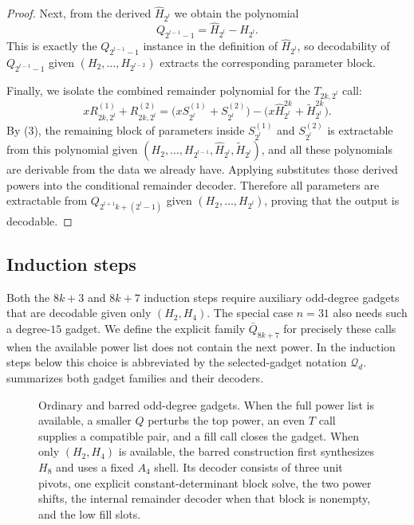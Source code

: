 \begin{proof}
    Next, from the derived $\hat H_{2^l}$ we obtain the polynomial
    \[
      Q_{2^{l-1}-1}=\hat H_{2^l}-H_{2^l}.
    \]
    This is exactly the $Q_{2^{l-1}-1}$ instance in the definition of $\hat H_{2^l}$, so decodability of $Q_{2^{l-1}-1}$ given $(H_2,\ldots,H_{2^{l-2}})$ extracts the corresponding parameter block.

    Finally, we isolate the combined remainder polynomial for the $T_{2k,2^l}$ call:
    \[
      xR^{(1)}_{2k,2^l}+R^{(2)}_{2k,2^l}
        = \bigl(xS^{(1)}_{2^l}+S^{(2)}_{2^l}\bigr) - \bigl(x\hat H_{2^l}^{2k}+\tilde H_{2^l}^{2k}\bigr).
    \]
    By (3), the remaining block of parameters inside $S^{(1)}_{2^l}$ and $S^{(2)}_{2^l}$ is extractable from this polynomial given $(H_2,\ldots,H_{2^{l-1}},\hat H_{2^l},\tilde H_{2^l})$, and all these polynomials are derivable from the data we already have.
    Applying  substitutes those derived
    powers into the conditional remainder decoder.
    Therefore all parameters are extractable from $Q_{2^{l+1}k+(2^l-1)}$ given $(H_2,\ldots,H_{2^l})$, proving that the output is decodable.
\end{proof}

\subsection{Induction steps}

Both the $8k+3$ and $8k+7$ induction steps require auxiliary odd-degree
gadgets that are decodable given only $(H_2,H_4)$.  The special case $n=31$
also needs such a degree-$15$ gadget.  We define the explicit family
$\bar Q_{8k+7}$ for precisely these calls when the available power list
does not contain the next power.  In the induction steps below this choice is
abbreviated by the selected-gadget notation $\mathcal Q_d$.
 summarizes both gadget families and their decoders.

\begin{figure}[H]
  \centering
  \resizebox{\textwidth}{!}{}
  \caption{Ordinary and barred odd-degree gadgets.  When the full power
  list is available, a smaller $Q$ perturbs the top power, an even $T$ call
  supplies a compatible pair, and a fill call closes the gadget.  When only
  $(H_2,H_4)$ is available, the barred construction first synthesizes
  $H_8$ and uses a fixed $A_4$ shell.  Its decoder consists of three unit
  pivots, one explicit constant-determinant block solve, the two power
  shifts, the internal remainder decoder when that block is nonempty, and
  the low fill slots.}
  \label{fig:odd-gadgets}
\end{figure}

